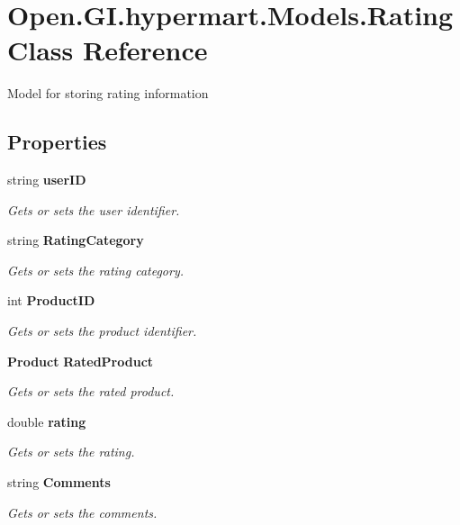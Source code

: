 \section{Open.\+G\+I.\+hypermart.\+Models.\+Rating Class Reference}
\label{class_open_1_1_g_i_1_1hypermart_1_1_models_1_1_rating}


Model for storing rating information  


\subsection*{Properties}
\begin{DoxyCompactItemize}
\item 
string \textbf{ user\+ID}\hspace{0.3cm}{\ttfamily  [get, set]}
\begin{DoxyCompactList}\small\item\em Gets or sets the user identifier. \end{DoxyCompactList}\item 
string \textbf{ Rating\+Category}\hspace{0.3cm}{\ttfamily  [get, set]}
\begin{DoxyCompactList}\small\item\em Gets or sets the rating category. \end{DoxyCompactList}\item 
int \textbf{ Product\+ID}\hspace{0.3cm}{\ttfamily  [get, set]}
\begin{DoxyCompactList}\small\item\em Gets or sets the product identifier. \end{DoxyCompactList}\item 
\textbf{ Product} \textbf{ Rated\+Product}\hspace{0.3cm}{\ttfamily  [get, set]}
\begin{DoxyCompactList}\small\item\em Gets or sets the rated product. \end{DoxyCompactList}\item 
double \textbf{ rating}\hspace{0.3cm}{\ttfamily  [get, set]}
\begin{DoxyCompactList}\small\item\em Gets or sets the rating. \end{DoxyCompactList}\item 
string \textbf{ Comments}\hspace{0.3cm}{\ttfamily  [get, set]}
\begin{DoxyCompactList}\small\item\em Gets or sets the comments. \end{DoxyCompactList}\end{DoxyCompactItemize}


